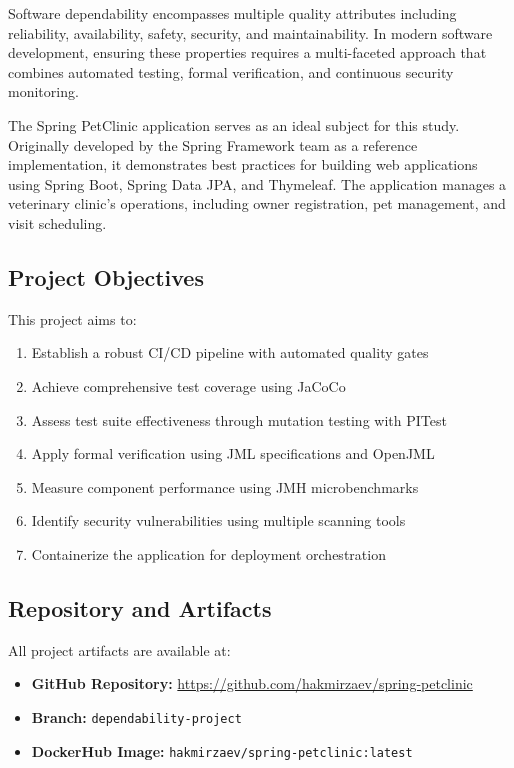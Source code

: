 \documentclass[sigconf]{acmart}
\begin{document}
Software dependability encompasses multiple quality attributes including reliability, availability, safety, security, and maintainability. In modern software development, ensuring these properties requires a multi-faceted approach that combines automated testing, formal verification, and continuous security monitoring.

The Spring PetClinic application serves as an ideal subject for this study. Originally developed by the Spring Framework team as a reference implementation, it demonstrates best practices for building web applications using Spring Boot, Spring Data JPA, and Thymeleaf. The application manages a veterinary clinic's operations, including owner registration, pet management, and visit scheduling.

\subsection{Project Objectives}

This project aims to:
\begin{enumerate}
    \item Establish a robust CI/CD pipeline with automated quality gates
    \item Achieve comprehensive test coverage using JaCoCo
    \item Assess test suite effectiveness through mutation testing with PITest
    \item Apply formal verification using JML specifications and OpenJML
    \item Measure component performance using JMH microbenchmarks
    \item Identify security vulnerabilities using multiple scanning tools
    \item Containerize the application for deployment orchestration
\end{enumerate}

\subsection{Repository and Artifacts}

All project artifacts are available at:
\begin{itemize}
    \item \textbf{GitHub Repository:} \url{https://github.com/hakmirzaev/spring-petclinic}
    \item \textbf{Branch:} \texttt{dependability-project}
    \item \textbf{DockerHub Image:} \texttt{hakmirzaev/spring-petclinic:latest}
\end{itemize}
\end{document}
